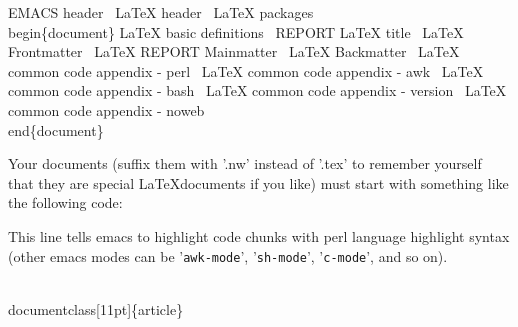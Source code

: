 \documentclass[11pt]{article}
\def\nwendcode{\endtrivlist \endgroup} %
\let\nwdocspar=\par                    %
\begin{document}
\nwenddocs{}\endmoddef
\LA{}EMACS header~{\nwtagstyle{}}\RA{}
\LA{}LaTeX header~{\nwtagstyle{}}\RA{}
\LA{}LaTeX packages~{\nwtagstyle{}}\RA{}
%
%
\\begin\{document\}
%
\LA{}LaTeX basic definitions~{\nwtagstyle{}}\RA{}
\LA{}REPORT LaTeX title~{\nwtagstyle{}}\RA{}
%
\LA{}LaTeX Frontmatter~{\nwtagstyle{}}\RA{}
\LA{}LaTeX REPORT Mainmatter~{\nwtagstyle{}}\RA{}
\LA{}LaTeX Backmatter~{\nwtagstyle{}}\RA{}
%
\LA{}LaTeX common code appendix - perl~{\nwtagstyle{}}\RA{}
\LA{}LaTeX common code appendix - awk~{\nwtagstyle{}}\RA{}
\LA{}LaTeX common code appendix - bash~{\nwtagstyle{}}\RA{}
\LA{}LaTeX common code appendix - version~{\nwtagstyle{}}\RA{}
\LA{}LaTeX common code appendix - noweb~{\nwtagstyle{}}\RA{}
%
\\end\{document\}
%
\nwendcode{}\nwdocspar


Your {\noweb} documents (suffix them with '.nw' instead of '.tex' to remember yourself that they are special \LaTeX documents if you like) must start with something like the following code:

\nwenddocs{}\endmoddef
\nwendcode{}\nwdocspar

This line tells emacs to highlight code chunks with perl language highlight syntax (other emacs modes can be '{\tt{}awk-mode}', '{\tt{}sh-mode}', '{\tt{}c-mode}', and so on).


\nwenddocs{}\endmoddef
\\documentclass[11pt]\{article\}
%
%
%
\nwendcode{}\nwdocspar
\end{document}
